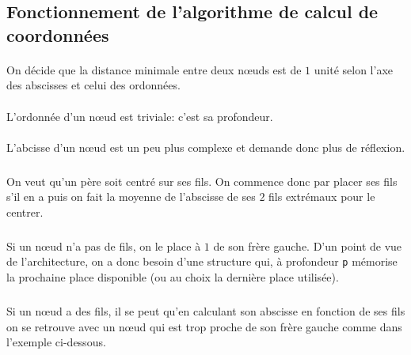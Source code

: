 	\subsection{Fonctionnement de l'algorithme de calcul de coordonnées}

\paragraph{}On décide que la distance minimale entre deux n\oe uds est de $1$ unité selon l'axe des abscisses et celui des ordonnées.

\paragraph{}L'ordonnée d'un n\oe ud est triviale: c'est sa profondeur.

\paragraph{}L'abcisse d'un n\oe ud est un peu plus complexe et demande donc plus de réflexion. 

\subparagraph{}On veut qu'un père soit centré sur ses fils. On commence donc par placer ses fils s'il en a puis on fait la moyenne de l'abscisse de ses $2$ fils extrémaux pour le centrer. 

\subparagraph{}Si un n\oe ud n'a pas de fils, on le place à $1$ de son frère gauche. D'un point de vue de l'architecture, on a donc besoin d'une structure qui, à profondeur \verb|p| mémorise la prochaine place disponible (ou au choix la dernière place utilisée).

\subparagraph{}Si un n\oe ud a des fils, il se peut qu'en calculant son abscisse en fonction de ses fils on se retrouve avec un n\oe ud qui est trop proche de son frère gauche comme dans l'exemple ci-dessous. 


